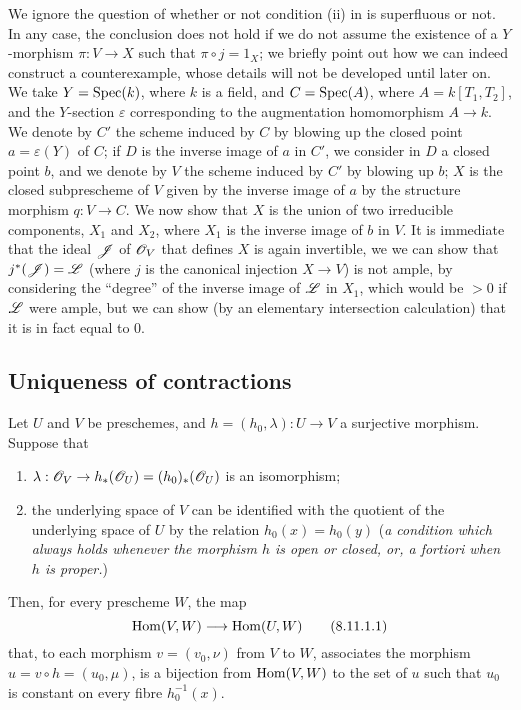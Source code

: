 \begin{remark}[8.10.7]
\label{II.8.10.7}
We ignore the question of whether or not condition (ii) in  is superfluous or not.
In any case, the conclusion does not hold if we do not assume the existence of a $Y$-morphism $\pi:V\to X$ such that $\pi\circ j=1_X$;
we briefly point out how we can indeed construct a counterexample, whose details will not be developed until later on.
We take $Y=\operatorname{Spec}(k)$, where $k$ is a field, and $C=\operatorname{Spec}(A)$, where $A=k[T_1,T_2]$, and the $Y$-section $\varepsilon$ corresponding to the augmentation homomorphism $A\to k$.
We denote by $C'$ the scheme induced by $C$ by blowing up the closed point $a=\varepsilon(Y)$ of $C$;
if $D$ is the inverse image of $a$ in $C'$, we consider in $D$ a closed point $b$,
and we denote by $V$ the scheme induced by $C'$ by blowing up $b$;
$X$ is the closed subprescheme of $V$ given by the inverse image of $a$ by the structure morphism $q:V\to C$.
We now show that $X$ is the union of two irreducible components, $X_1$ and $X_2$, where $X_1$ is the inverse image of $b$ in $V$.
It is immediate that the ideal $\mathscr{J}$ of $\mathscr{O}_V$ that defines $X$ is again invertible, we we can show that $j^*(\mathscr{J})=\mathscr{L}$ (where $j$ is the canonical injection $X\to V$) is not ample, by considering the ``degree'' of the inverse image of $\mathscr{L}$ in $X_1$, which would be $>0$ if $\mathscr{L}$ were ample, but we can show (by an elementary intersection calculation) that it is in fact equal to $0$.
\end{remark}


\subsection{Uniqueness of contractions}
\label{subsection:II.8.11}

\begin{lemma}[8.11.1]
\label{II.8.11.1}
Let $U$ and $V$ be preschemes, and $h=(h_0,\lambda):U\to V$ a surjective morphism.
Suppose that
\begin{enumerate}
    \item $\lambda:\sh{O}_V\to h_*(\sh{O}_U) = (h_0)_*(\sh{O}_U)$ is an isomorphism;
    \item the underlying space of $V$ can be identified with the quotient of the underlying space of $U$ by the relation $h_0(x)=h_0(y)$ (\emph{a condition which always holds whenever the morphism $h$ is \emph{open} or \emph{closed}, or, \emph{a fortiori} when $h$ is \emph{proper}.})
\end{enumerate}
Then, for every prescheme $W$, the map
\[
\label{II.8.11.1.1}
    \Hom(V,W) \to \Hom(U,W)
\tag{8.11.1.1}
\]
that, to each morphism $v=(v_0,\nu)$ from $V$ to $W$, associates the morphism $u=v\circ h=(u_0,\mu)$, is a bijection from $\operatorname{Hom}(V,W)$ to the set of $u$ such that $u_0$ is constant on every fibre $h_0^{-1}(x)$.
\end{lemma}


